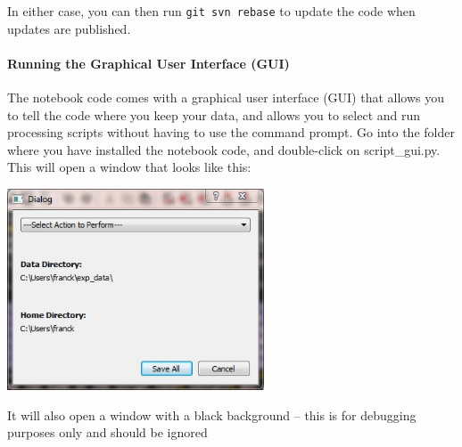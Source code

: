 In either case, you can then run \texttt{git svn rebase} to update the code when updates are published.
\paragraph{Running the Graphical User Interface (GUI)}
The notebook code comes with a graphical user interface
    (GUI) that allows you to tell the
    code where you keep your data,
    and allows you to select and run processing scripts
    without having to use the command prompt.
Go into the folder where you have installed the notebook code,
    and double-click on script\_gui.py.
This will open a window that looks like this:
\begin{center}
    \includegraphics[width=3in]{sketches/script_gui.jpg}
\end{center}
It will also open a window with a black background --
    this is for debugging purposes only
    and should be ignored 

